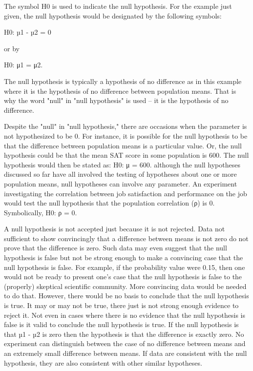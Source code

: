The symbol H0 is used to indicate the null hypothesis. For the example just given, the null hypothesis would be designated by the following symbols:


H0: µ1 - µ2 = 0


or by


H0: μ1 = μ2.


The null hypothesis is typically a hypothesis of no difference as in this example where it is the hypothesis of no difference between population means. That is why the word "null" in "null hypothesis" is used -- it is the hypothesis of no difference. 


Despite the "null" in "null hypothesis," there are occasions when the parameter is not hypothesized to be 0. For instance, it is possible for the null hypothesis to be that the difference between population means is a particular value. Or, the null hypothesis could be that the mean SAT score in some population is 600. The null hypothesis would then be stated as: H0: μ = 600. although the null hypotheses discussed so far have all involved the testing of hypotheses about one or more population means, null hypotheses can involve any parameter. An experiment investigating the correlation between job satisfaction and performance on the job would test the null hypothesis that the population correlation (ρ) is 0. Symbolically, H0: ρ = 0.


A null hypothesis is not accepted just because it is not rejected. Data not sufficient to show convincingly that a difference between means is not zero do not prove that the difference is zero. Such data may even suggest that the null hypothesis is false but not be strong enough to make a convincing case that the null hypothesis is false. For example, if the probability value were 0.15, then one would not be ready to present one's case that the null hypothesis is false to the (properly) skeptical scientific community. More convincing data would be needed to do that. However, there would be no basis to conclude that the null hypothesis is true. It may or may not be true, there just is not strong enough evidence to reject it. Not even in cases where there is no evidence that the null hypothesis is false is it valid to conclude the null hypothesis is true. If the null hypothesis is that µ1 - µ2 is zero then the hypothesis is that the difference is exactly zero. No experiment can distinguish between the case of no difference between means and an extremely small difference between means. If data are consistent with the null hypothesis, they are also consistent with other similar hypotheses. 


